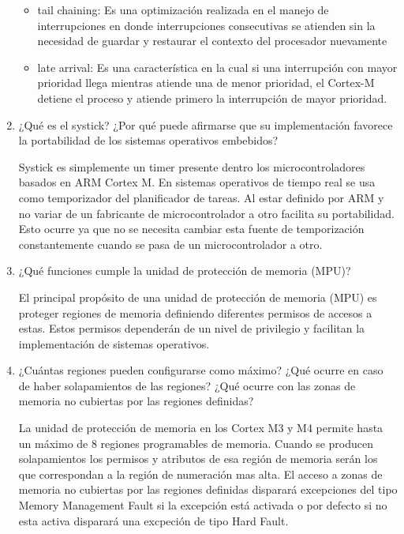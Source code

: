 \documentclass[12pt, a4paper]{article}
\makeatletter
\newcommand\setItemnumber[1]{\setcounter{enum\romannumeral\@enumdepth}{\numexpr#1-1\relax}}
\makeatother
\begin{document}
\begin{enumerate}
    \begin{itemize}
        \item tail chaining: Es una optimización realizada en el manejo de interrupciones en donde 
        interrupciones consecutivas se atienden sin la necesidad de guardar y restaurar el contexto del 
        procesador nuevamente  
        
        \item late arrival: Es una característica en la cual si una interrupción con mayor prioridad 
        llega mientras atiende una de menor prioridad, el Cortex-M detiene el proceso y atiende primero 
        la interrupción de mayor prioridad.
    \end{itemize}
    
    
    \setItemnumber{17}
    \item ¿Qué es el systick? ¿Por qué puede afirmarse que su implementación favorece la portabilidad 
    de los sistemas operativos embebidos?
    
    Systick es simplemente un timer presente dentro los microcontroladores basados en ARM Cortex M. 
    En sistemas operativos de tiempo real se usa como temporizador del planificador de tareas. Al 
    estar definido por ARM y no variar de un fabricante de microcontrolador a otro facilita
    su portabilidad. Esto ocurre ya que no se necesita cambiar esta fuente de temporización 
    constantemente cuando se pasa de un microcontrolador a otro.
    
    \setItemnumber{18}
    \item ¿Qué funciones cumple la unidad de protección de memoria (MPU)?
    
    El principal propósito de una unidad de protección de memoria (MPU) es proteger regiones de
    memoria definiendo diferentes permisos de accesos a estas. Estos permisos dependerán de un 
    nivel de privilegio y facilitan la implementación de sistemas operativos.
    
    \setItemnumber{19}
    \item¿Cuántas regiones pueden configurarse como máximo? ¿Qué ocurre en caso de haber solapamientos de 
    las regiones? ¿Qué ocurre con las zonas de memoria no cubiertas por las regiones definidas?
    
    La unidad de protección de memoria en los Cortex M3 y M4 permite hasta un máximo de 8 regiones 
    programables de memoria. Cuando se producen solapamientos los permisos y atributos de esa región de 
    memoria serán los que correspondan a la región de numeración mas alta. El acceso  a zonas de memoria 
    no cubiertas por las regiones definidas disparará excepciones del tipo Memory Management Fault si 
    la excepción está activada o por defecto si no esta activa disparará una excpeción de tipo Hard Fault.
    
\end{enumerate}
\end{document}
